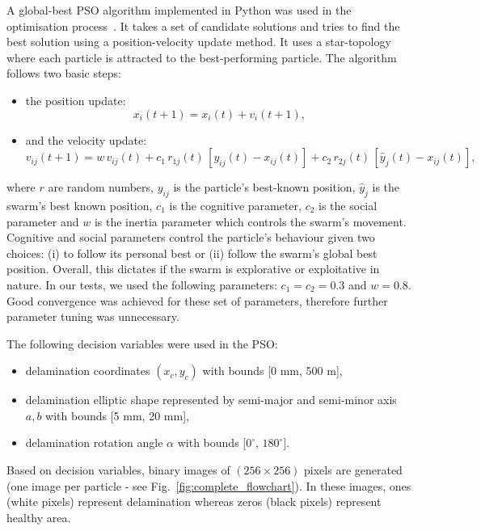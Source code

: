 \documentclass[pdflatex,sn-mathphys-num]{sn-jnl}%
\begin{document}
	A global-best PSO algorithm implemented in Python was used in the 
	optimisation process~\cite{MirandaLesterJames}.
	It takes a set of candidate solutions and tries to find the best solution 
	using a position-velocity update method. 
	It uses a star-topology where each particle is attracted to the 
	best-performing particle.
	The algorithm follows two basic steps:
	\begin{itemize}
		\item the position update:
		\begin{equation}
			x_i(t+1) = x_i(t) + v_i(t+1),\label{eq:position_update}
		\end{equation}
		\item and the velocity update:
		\begin{equation}
			v_{ij}(t+1) = w\, v_{ij}(t) + c_1\, r_{1j}(t) \,[y_{ij}(t) - 
			x_{ij}(t)] + c_2\, r_{2j}(t)\,[\hat{y}_j(t) - 
			x_{ij}(t)],\label{eq:velocity_update}
		\end{equation}
	\end{itemize}
	where $r$ are random numbers, $y_{ij}$ is the particle's best-known 
	position, $\hat{y}_j$ is the swarm's best known position, $c_1$ is the 
	cognitive parameter, $c_2$ is the social parameter and $w$ is the inertia 
	parameter which controls the swarm's movement.
	Cognitive and social parameters control the particle's behaviour given two 
	choices: (i) to follow its personal best or (ii) follow the swarm’s global 
	best position.
	Overall, this dictates if the swarm is explorative or exploitative in 
	nature. 
	In our tests, we used the following parameters: $c_1 = c_2 = 0.3$ and 
	$w=0.8$.
	Good convergence was achieved for these set of parameters, therefore 
	further parameter tuning was unnecessary.
	
	The following decision variables were used in the PSO:
	\begin{itemize}
		\item delamination coordinates $(x_c, y_c)$ with bounds [0 mm, 500 m],
		\item delamination elliptic shape represented by semi-major and 
		semi-minor axis $a, b$ with bounds [5 mm, 20 mm],
		\item delamination rotation angle $\alpha$ with bounds [$0^\circ$, 
		$180^\circ$].
	\end{itemize}
	
	Based on decision variables, binary images of $(256\times256)$ pixels are 
	generated (one image per particle - see Fig.~\ref{fig:complete_flowchart}).
	In these images, ones (white pixels) represent delamination whereas zeros 
	(black pixels) represent healthy area.
	
\end{document}
